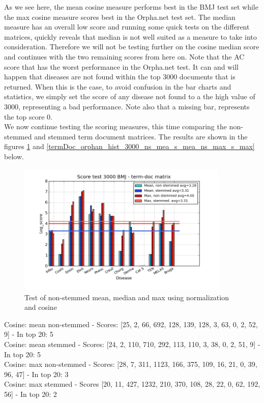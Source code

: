 As we see here, the mean cosine measure performs best in the BMJ test set while the max cosine measure scores best in the Orpha.net test set. The median measure has an overall low score and running some quick tests on the different matrices, quickly reveals that median is not well suited as a measure to take into consideration. Therefore we will not be testing further on the cosine median score and continues with the two remaining scores from here on. Note that the AC score that has the worst performance in the Orpha.net test. It can and will happen that diseases are not found within the top 3000 documents that is returned. When this is the case, to avoid confusion in the bar charts and statistics, we simply set the score of any disease not found to a the high value of 3000, representing a bad performance. Note also that a missing bar, represents the top score 0. \\

We now continue testing the scoring measures, this time comparing the non-stemmed and stemmed term document matrices. The results are shown in the figures \ref{termDoc_bmj_hist_3000_ns_mea_s_mea_ns_max_s_max} and \ref{termDoc_orphan_hist_3000_ns_mea_s_mea_ns_max_s_max} below.

\begin{figure}[h!]
        \begin{center}
          \includegraphics[width=0.9\textwidth]{barcharts/termDoc_bmj_hist_3000_ns_mea_s_mea_ns_max_s_max.png}
        \end{center}
        \caption{Test of non-stemmed mean, median and max using normalization and cosine}
        \label{termDoc_bmj_hist_3000_ns_mea_s_mea_ns_max_s_max}
\end{figure}

Cosine: mean non-stemmed - Scores: [25, 2, 66, 692, 128, 139, 128, 3, 63, 0, 2, 52, 9] - In top 20: 5 \\
Cosine: mean stemmed - Scores: [24, 2, 110, 710, 292, 113, 110, 3, 38, 0, 2, 51, 9] - In top 20: 5 \\
Cosine: max non-stemmed - Scores: [28, 7, 311, 1123, 166, 375, 109, 16, 21, 0, 39, 96, 47] - In top 20: 3 \\
Cosine: max stemmed - Scores [20, 11, 427, 1232, 210, 370, 108, 28, 22, 0, 62, 192, 56] - In top 20: 2


